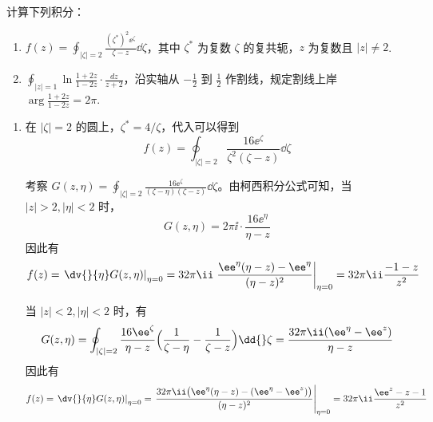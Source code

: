 
\begin{question}
计算下列积分：

\begin{enumerate}
  \item \(\displaystyle f(z)=\oint_{|\zeta|=2} \frac{(\zeta^*)^2 \ee^{\zeta}}{\zeta-z} \dd{}\zeta\)，其中 \(\zeta^*\) 为复数 \(\zeta\) 的复共轭，\(z\) 为复数且 \(|z|\neq2\).

  \item \(\displaystyle \oint_{|z|=1} \ln\frac{1+2z}{1-2z} \cdot \frac{dz}{z+2}\)，沿实轴从 \(\displaystyle -\frac12\) 到 \(\displaystyle \frac12\) 作割线，规定割线上岸 \(\displaystyle \arg\frac{1+2z}{1-2z}=2\pi\).

\begin{center}
\end{center}

\end{enumerate}
\begin{solution}
\begin{enumerate}
  \item 在 \(|\zeta|=2\) 的圆上，\(\zeta^*=4/\zeta\)，代入可以得到
\[ f(z)=\oint_{|\zeta|=2} \frac{16\ee^{\zeta}}{\zeta^2(\zeta-z)}\dd{\zeta} \]

考察 \(G(z,\eta)=\displaystyle\oint_{|\zeta|=2} \frac{16\ee^{\zeta}}{(\zeta-\eta)(\zeta-z)}\dd{}\zeta\)。由柯西积分公式可知，当 \(|z|>2,|\eta|<2\) 时，
\[ G(z,\eta)=2\pi\ii \cdot \frac{16\ee^{\eta}}{\eta-z} \]
因此有
\[ f(z)=\left.\dv{}{\eta}G(z,\eta)\right|_{\eta=0}=32\pi\ii \left.\frac{\ee^{\eta}(\eta-z)-\ee^{\eta}}{(\eta-z)^2}\right|_{\eta=0}=32\pi\ii\frac{-1-z}{z^2} \]

当 \(|z|<2,|\eta|<2\) 时，有
\[ G(z,\eta)=\oint_{|\zeta|=2}\frac{16\ee^{\zeta}}{\eta-z}\Bigl(\frac1{\zeta-\eta}-\frac1{\zeta-z}\Bigr)\dd{}\zeta=\frac{32\pi\ii(\ee^{\eta}-\ee^{z})}{\eta-z} \]
因此有
\[ f(z)=\left.\dv{}{\eta}G(z,\eta)\right|_{\eta=0}=\left.\frac{32\pi\ii\bigl(\ee^{\eta}(\eta-z)-(\ee^{\eta}-\ee^{z})\bigr)}{(\eta-z)^2}\right|_{\eta=0}=32\pi\ii\frac{\ee^{z}-z-1}{z^2} \]


\end{enumerate}
\end{solution}
\end{question}

